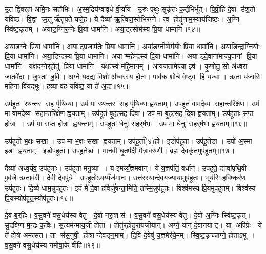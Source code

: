 उ॒त द्वि॒बर्‌हा॑ अमि॒नः सहो॑भिः। अ॒स्म॒द्रिय॑ग्वावृधे वी॒र्या॑य। उ॒रुः पृ॒थुः सुकृ॑तः क॒र्तृभि॑र्भूत्। पि॒प्री॒हि दे॒वा उ॑श॒तो य॑विष्ठ। वि॒द्वा ऋ॒तूर्\mbox{}ऋ॑तुपते यजे॒ह। ये दैव्या॑ ऋ॒त्विज॒स्तेभि॑रग्ने। त्व होतॄ॑णाम॒स्याय॑जिष्ठः। अ॒ग्नि स्वि॑ष्ट॒कृतम्। अया॑ड॒ग्निर॒ग्नेः प्रि॒या धामा॑नि। अया॒ट्त्सोम॑स्य प्रि॒या धामा॑नि॥१४॥

अया॑ड॒ग्नेः प्रि॒या धामा॑नि। अयाट्प्र॒जाप॑तेः प्रि॒या धामा॑नि। अया॑ड॒ग्नीषोम॑योः प्रि॒या धामा॑नि। अया॑डिन्द्राग्नि॒योः प्रि॒या धामा॑नि। अया॒डिन्द्र॑स्य प्रि॒या धामा॑नि। अयाण्महे॒न्द्रस्य॑ प्रि॒या धामा॑नि। अयाड्दे॒वाना॑माज्य॒पानां प्रि॒या धामा॑नि। यक्ष॑द॒ग्नेर्‌होतु॑ प्रि॒या धामा॑नि। यक्ष॒त्स्वं म॑हि॒मानम्। आय॑जता॒मेज्या॒ इष॑। कृ॒णोतु॒ सो अ॑ध्व॒रा जा॒तवे॑दाः। जु॒षता ह॒विः। अग्ने॒ यद॒द्य वि॒शो अ॑ध्वरस्य होतः। पाव॑क शोचे॒ वेष्ट्व हि यज्वा। ऋ॒ता य॑जासि महि॒ना वियद्भूः। ह॒व्या व॑ह यविष्ठ॒ या ते॑ अ॒द्य॥१५॥\anuvakamend[अ॒स्त्व॒ध॒त्त॒ र॒यिञ्च॑र्‌षणि॒प्राः सोम॑स्य प्रि॒या धामा॒नीष॒ष्षट्च॑]

उप॑हूत रथन्त॒र स॒ह पृ॑थि॒व्या। उप॑ मा रथन्त॒र स॒ह पृ॑थि॒व्या ह्व॑यताम्। उप॑हूतं वामदे॒व्य स॒हान्तरि॑क्षेण। उप॑ मा वामदे॒व्य स॒हान्तरि॑क्षेण ह्वयताम्। उप॑हूतं बृ॒हत्स॒ह दि॒वा। उप॑ मा बृ॒हत्स॒ह दि॒वा ह्व॑यताम्। उप॑हूताः स॒प्त होत्रा। उप॑ मा स॒प्त होत्रा ह्वयन्ताम्। उप॑हूता धे॒नुः स॒हर्‌ष॑भा। उप॑ मा धे॒नुः स॒हर्‌ष॑भा ह्वयताम्॥१६॥

उप॑हूतो भ॒क्षः सखा। उप॑ मा भ॒क्षः सखा ह्वयताम्। उप॑हू॒ताँ(४)हो। इडोप॑हूता। उप॑हू॒तेडा। उपो॑ अ॒स्मा इडा ह्वयताम्। इडोप॑हूता। उप॑हू॒तेडा। मा॒न॒वी घृ॒तप॑दी मैत्रावरु॒णी। ब्रह्म॑ दे॒वकृ॑त॒मुप॑हूतम्॥१७॥

दैव्या॑ अध्व॒र्यव॒ उप॑हूताः। उप॑हूता मनु॒ष्या। य इ॒मय्यँ॒ज्ञमवान्॑। ये य॒ज्ञप॑तिं॒ वर्धान्॑। उप॑हूते॒ द्यावा॑पृथि॒वी। पू॒र्व॒जे ऋ॒ताव॑री। दे॒वी दे॒वपु॑त्रे। उप॑हूतो॒ऽयय्यँज॑मानः। उत्त॑रस्यान्देवय॒ज्याया॒मुप॑हूतः। भूय॑सि हवि॒ष्कर॑ण॒ उप॑हूतः। दि॒व्ये धाम॒न्नुप॑हूतः। इ॒दं मे॑ दे॒वा ह॒विर्जु॑षन्ता॒मिति॒ तस्मि॒न्नुप॑हूतः। विश्व॑मस्य प्रि॒यमुप॑हूतम्। विश्व॑स्य प्रि॒यस्योप॑हूत॒स्योप॑हूतः॥१८॥\anuvakamend[स॒हर्‌ष॑भा ह्वयता॒मुप॑हूत हवि॒ष्कर॑ण॒ उप॑हूतश्च॒त्वारि॑ च]

दे॒वं ब॒र्‌हिः। व॒सु॒वने॑ वसु॒धेय॑स्य वेतु। दे॒वो नरा॒शस॑। व॒सु॒वने॑ वसु॒धेय॑स्य वेतु। दे॒वो अ॒ग्निः स्वि॑ष्ट॒कृत्। सु॒द्रवि॑णा म॒न्द्रः क॒विः। स॒त्यम॑न्माय॒जी होता। होतु॑र्‌होतु॒राय॑जीयान्। अग्ने॒ यान् दे॒वानयाट्। या अपि॑प्रेः। ये ते॑ हो॒त्रे अम॑त्सत। ता स॑स॒नुषी॒ होत्रान्देवङ्ग॒माम्। दि॒वि दे॒वेषु॑ य॒ज्ञमेर॑ये॒मम्। स्वि॒ष्ट॒कृच्चाग्ने॒ होताऽभू। व॒सु॒वने॑ वसु॒धेय॑स्य नमोवा॒के वीहि॑॥१९॥\anuvakamend[अपि॑प्रे॒ पञ्च॑ च]

